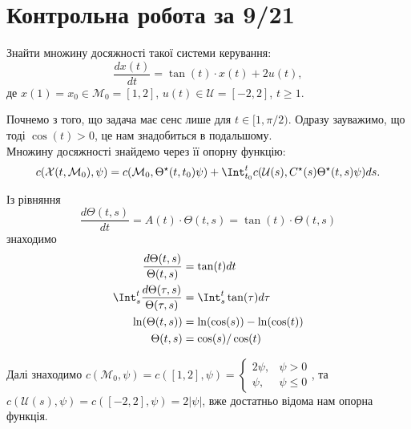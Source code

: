 \setcounter{section}{2}

\section{Контрольна робота за 9/21}

\begin{problem*}
    Знайти множину досяжності такої системи керування:
    \[\dfrac{dx(t)}{dt} = \tan (t) \cdot x(t) + 2u(t),\] 
    де $x(1) = x_0 \in \mathcal{M}_0 = [1, 2]$, $u(t) \in \mathcal{U} = [-2, 2]$, $t\ge1$.
\end{problem*}

\begin{solution}
    Почнемо з того, що задача має сенс лише для $t \in [1, \pi / 2)$. Одразу зауважимо, що тоді $\cos (t) > 0$, це нам знадобиться в подальшому.\\
    
    Множину досяжності знайдемо через її опорну функцію: 
    \[ c(\mathcal{X}(t, \mathcal{M}_0), \psi) = c(\mathcal{M}_0, \Theta^\star(t, t_0) \psi) + \Int_{t_0}^t c(\mathcal{U}(s), C^\star(s) \Theta^\star(t, s)\psi) ds. \]
    
    Із рівняння \[ \dfrac {d \Theta(t, s)} {d t} = A(t) \cdot \Theta(t, s) = \tan (t) \cdot \Theta(t, s) \] знаходимо
    \begin{equation*}
        \begin{aligned}
            \dfrac {d \Theta(t, s)} {\Theta(t, s)} &= \tan (t) d t \\
            \Int_s^t \dfrac {d \Theta(\tau, s)} {\Theta(\tau, s)} &= \Int_s^t \tan (\tau) d \tau \\
            \ln (\Theta(t, s)) &= \ln (\cos (s)) - \ln (\cos (t)) \\
            \Theta(t, s) &= \cos (s) / \cos (t)
        \end{aligned}
    \end{equation*}
    
    Далі знаходимо $c(\mathcal{M}_0, \psi) = c([1, 2], \psi) = \begin{cases}2 \psi, & \psi > 0 \\ \psi, & \psi \le 0 \end{cases}$, та $c(\mathcal{U}(s), \psi) = c([-2, 2], \psi) = 2 |\psi|$, вже достатньо відома нам опорна функція. \\
    

\end{solution}
